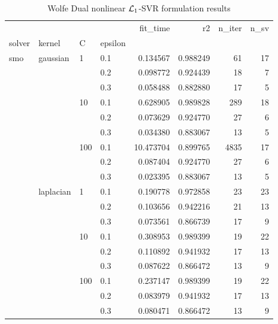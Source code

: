 \begin{table}[H]
\centering
\caption{Wolfe Dual nonlinear $\protect \mathcal{L}_1$-SVR formulation results}
\label{nonlinear_dual_l1_svr_cv_results}
\begin{tabular}{llllrrrr}
\toprule
       &           &     &     &   fit\_time &        r2 &  n\_iter &  n\_sv \\
solver & kernel & C & epsilon &            &           &         &       \\
\midrule
smo & gaussian & 1   & 0.1 &   0.134567 &  0.988249 &      61 &    17 \\
       &           &     & 0.2 &   0.098772 &  0.924439 &      18 &     7 \\
       &           &     & 0.3 &   0.058488 &  0.882880 &      17 &     5 \\
       &           & 10  & 0.1 &   0.628905 &  0.989828 &     289 &    18 \\
       &           &     & 0.2 &   0.073629 &  0.924770 &      27 &     6 \\
       &           &     & 0.3 &   0.034380 &  0.883067 &      13 &     5 \\
       &           & 100 & 0.1 &  10.473704 &  0.899765 &    4835 &    17 \\
       &           &     & 0.2 &   0.087404 &  0.924770 &      27 &     6 \\
       &           &     & 0.3 &   0.023395 &  0.883067 &      13 &     5 \\
       & laplacian & 1   & 0.1 &   0.190778 &  0.972858 &      23 &    23 \\
       &           &     & 0.2 &   0.103656 &  0.942216 &      21 &    13 \\
       &           &     & 0.3 &   0.073561 &  0.866739 &      17 &     9 \\
       &           & 10  & 0.1 &   0.308953 &  0.989399 &      19 &    22 \\
       &           &     & 0.2 &   0.110892 &  0.941932 &      17 &    13 \\
       &           &     & 0.3 &   0.087622 &  0.866472 &      13 &     9 \\
       &           & 100 & 0.1 &   0.237147 &  0.989399 &      19 &    22 \\
       &           &     & 0.2 &   0.083979 &  0.941932 &      17 &    13 \\
       &           &     & 0.3 &   0.080471 &  0.866472 &      13 &     9 \\

\end{tabular}
\end{table}
